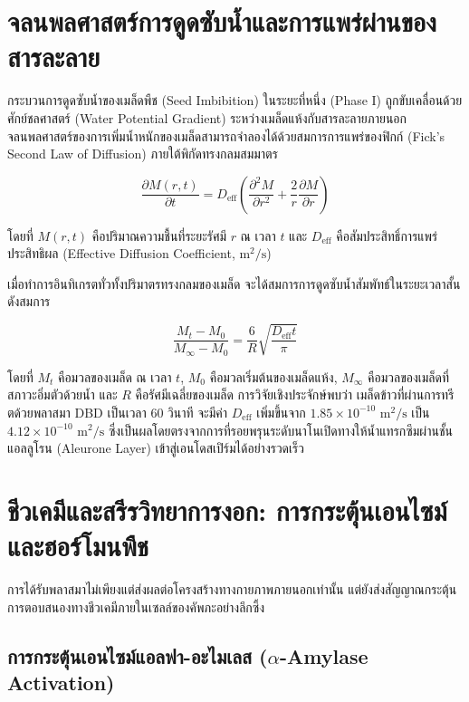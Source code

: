 \section{จลนพลศาสตร์การดูดซับน้ำและการแพร่ผ่านของสารละลาย}

กระบวนการดูดซับน้ำของเมล็ดพืช (Seed Imbibition) ในระยะที่หนึ่ง (Phase I) ถูกขับเคลื่อนด้วยศักย์ชลศาสตร์ (Water Potential Gradient) ระหว่างเมล็ดแห้งกับสารละลายภายนอก จลนพลศาสตร์ของการเพิ่มน้ำหนักของเมล็ดสามารถจำลองได้ด้วยสมการการแพร่ของฟิกก์ (Fick's Second Law of Diffusion) ภายใต้พิกัดทรงกลมสมมาตร

\begin{equation}
    \frac{\partial M(r, t)}{\partial t} = D_{\text{eff}} \left( \frac{\partial^2 M}{\partial r^2} + \frac{2}{r} \frac{\partial M}{\partial r} \right)
    \label{eq:fick_seed}
\end{equation}

โดยที่ $M(r, t)$ คือปริมาณความชื้นที่ระยะรัศมี $r$ ณ เวลา $t$ และ $D_{\text{eff}}$ คือสัมประสิทธิ์การแพร่ประสิทธิผล (Effective Diffusion Coefficient, $\text{m}^2/\text{s}$) 

เมื่อทำการอินทิเกรตทั่วทั้งปริมาตรทรงกลมของเมล็ด จะได้สมการการดูดซับน้ำสัมพัทธ์ในระยะเวลาสั้น ดังสมการ

\begin{equation}
    \frac{M_t - M_0}{M_\infty - M_0} = \frac{6}{R} \sqrt{\frac{D_{\text{eff}} t}{\pi}}
    \label{eq:imbibition_rate}
\end{equation}

โดยที่ $M_t$ คือมวลของเมล็ด ณ เวลา $t$, $M_0$ คือมวลเริ่มต้นของเมล็ดแห้ง, $M_\infty$ คือมวลของเมล็ดที่สภาวะอิ่มตัวด้วยน้ำ และ $R$ คือรัศมีเฉลี่ยของเมล็ด การวิจัยเชิงประจักษ์พบว่า เมล็ดข้าวที่ผ่านการทรีตด้วยพลาสมา DBD เป็นเวลา 60 วินาที จะมีค่า $D_{\text{eff}}$ เพิ่มขึ้นจาก $1.85 \times 10^{-10} \text{ m}^2/\text{s}$ เป็น $4.12 \times 10^{-10} \text{ m}^2/\text{s}$ ซึ่งเป็นผลโดยตรงจากการที่รอยพรุนระดับนาโนเปิดทางให้น้ำแทรกซึมผ่านชั้นแอลลูโรน (Aleurone Layer) เข้าสู่เอนโดสเปิร์มได้อย่างรวดเร็ว

\section{ชีวเคมีและสรีรวิทยาการงอก: การกระตุ้นเอนไซม์และฮอร์โมนพืช}

การได้รับพลาสมาไม่เพียงแต่ส่งผลต่อโครงสร้างทางกายภาพภายนอกเท่านั้น แต่ยังส่งสัญญาณกระตุ้นการตอบสนองทางชีวเคมีภายในเซลล์ของคัพภะอย่างลึกซึ้ง

\subsection{การกระตุ้นเอนไซม์แอลฟา-อะไมเลส ($\alpha$-Amylase Activation)}

